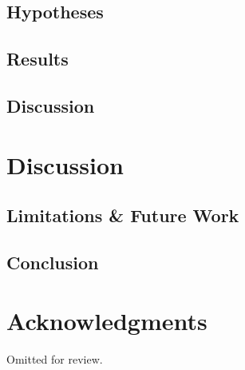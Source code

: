 \documentclass[chi_draft]{sigchi}
\begin{document}
\subsection{Hypotheses}
\subsection{Results}
\subsection{Discussion}

\section{Discussion}
\subsection{Limitations \& Future Work}
\subsection{Conclusion}
\section{Acknowledgments}

Omitted for review.

%
%
%
%
%
\balance{}




\end{document}
